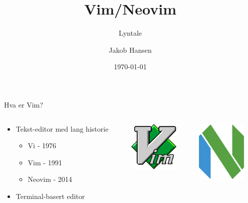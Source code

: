 \documentclass{beamer}
\title{Vim/Neovim}
\subtitle{Lyntale}
\author{Jakob Hansen}
\institute{UiO}
\date{\today}
\begin{document}
\begin{frame}
\end{frame}

\begin{frame}
	\titlepage
\end{frame}
\begin{frame}{Hva er Vim?}
	\begin{columns}
		\begin{column}{0.475\textwidth}
			\begin{itemize}
				\item Tekst-editor med lang historie
				      \begin{itemize}
					      \item Vi - 1976
					      \item Vim - 1991
					      \item Neovim - 2014
				      \end{itemize}
				\item Terminal-basert editor
			\end{itemize}
		\end{column}
		\begin{column}{0.25\textwidth}
			{\includegraphics[width=90px]{images/vim-logo-png-transparent.png}}
		\end{column}
		\begin{column}{0.25\textwidth}
			{\includegraphics[width=90px]{images/Neovim-mark-flat.svg.png}}
		\end{column}
	\end{columns}
\end{frame}
\end{document}
